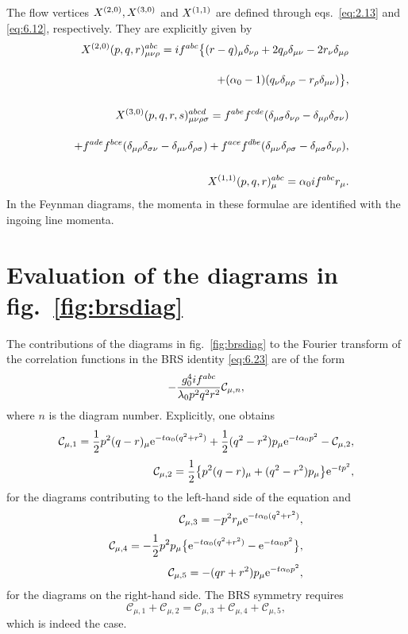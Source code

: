 The flow vertices $X^{(2,0)},X^{(3,0)}$ and $X^{(1,1)}$
are defined through eqs.~\eqref{eq:2.13} and \eqref{eq:6.12}, respectively.
They are explicitly given by
\begin{align}
  X^{(2,0)}(p,q,r)^{abc}_{\mu\nu\rho}=
  if^{abc}\bigl\{(r-q)_{\mu}\delta_{\nu\rho}
  +2q_{\rho}\delta_{\mu\nu}-2r_{\nu}\delta_{\mu\rho}
  \notag\\[2.5ex]
  +(\alpha_0-1)
  (q_{\nu}\delta_{\mu\rho}-r_{\rho}\delta_{\mu\nu})\bigr\},
  \label{eq:B.1}\\[3.5ex]
  X^{(3,0)}(p,q,r,s)^{abcd}_{\mu\nu\rho\sigma}=
  f^{abe}f^{cde}
  (\delta_{\mu\sigma}\delta_{\nu\rho}-\delta_{\mu\rho}\delta_{\sigma\nu})
  \notag\\[2.5ex]
  \quad
  +f^{ade}f^{bce}
  (\delta_{\mu\rho}\delta_{\sigma\nu}-\delta_{\mu\nu}\delta_{\rho\sigma})+
  f^{ace}f^{dbe}
  (\delta_{\mu\nu}\delta_{\rho\sigma}-\delta_{\mu\sigma}\delta_{\nu\rho}),
  \label{eq:B.2}\\[3.5ex]
  X^{(1,1)}(p,q,r)^{abc}_{\mu}=\alpha_0if^{abc}r_{\mu}.
  \label{eq:B.3}
\end{align}
In the Feynman diagrams, the momenta in these formulae are identified
with the ingoing line momenta.

\section{Evaluation of the diagrams in fig.~\ref{fig:brsdiag}}\label{app:C}

The contributions of the diagrams in fig.~\ref{fig:brsdiag} to the
Fourier transform of the correlation functions
in the BRS identity \eqref{eq:6.23} are of the form
\begin{equation}
   -{g_0^4if^{abc}\over \lambda_0 p^2q^2r^2}\mathcal{C}_{\mu,n},
   \label{eq:C.1}
\end{equation}
where $n$ is the diagram number. Explicitly, one obtains
\begin{align}
   \mathcal{C}_{\mu,1}=
   \frac{1}{2}p^2(q-r)_{\mu}\mathrm{e}^{-t\alpha_0(q^2+r^2)}+
   \frac{1}{2}(q^2-r^2)p_{\mu}\mathrm{e}^{-t\alpha_0p^2}
   -\mathcal{C}_{\mu,2},
   \label{eq:C.2}\\[3pt]
   \mathcal{C}_{\mu,2}=
   \frac{1}{2}\bigl\{p^2(q-r)_{\mu}+(q^2-r^2)p_{\mu}\bigr\}\mathrm{e}^{-tp^2},
   \label{eq:C.3}
\end{align}
for the diagrams contributing to the left-hand side of the equation
and
\begin{align}
   \mathcal{C}_{\mu,3}=-p^2r_{\mu}\mathrm{e}^{-t\alpha_0(q^2+r^2)},
   \label{eq:C.4}\\[3pt]
   \mathcal{C}_{\mu,4}=-\frac{1}{2}p^2p_{\mu}\bigl\{
   \mathrm{e}^{-t\alpha_0(q^2+r^2)}-\mathrm{e}^{-t\alpha_0p^2}\bigr\},
   \label{eq:C.5}\\[3pt]
   \mathcal{C}_{\mu,5}=-(qr+r^2)p_{\mu}\mathrm{e}^{-t\alpha_0p^2},
   \label{eq:C.6}
\end{align}
for the diagrams on the right-hand side. The BRS symmetry requires
\begin{equation}
   \mathcal{C}_{\mu,1}+\mathcal{C}_{\mu,2}=
   \mathcal{C}_{\mu,3}+\mathcal{C}_{\mu,4}+\mathcal{C}_{\mu,5},
   \label{eq:C.7}
\end{equation}
which is indeed the case.

